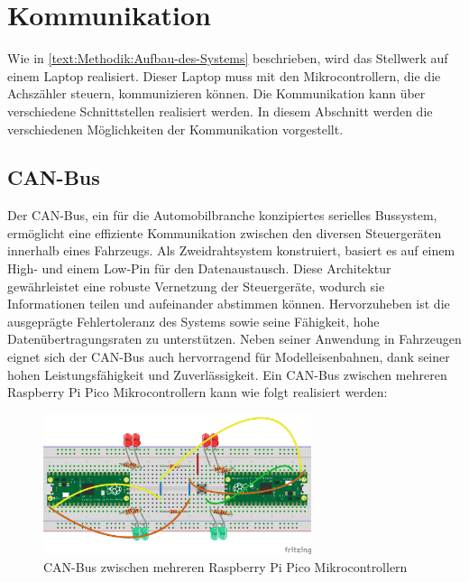 \section{Kommunikation}\label{text:Methodik:Kommunikation}

Wie in \autoref{text:Methodik:Aufbau-des-Systems} beschrieben, wird das Stellwerk auf einem Laptop realisiert. Dieser Laptop muss mit den Mikrocontrollern, die die Achszähler steuern, kommunizieren können. Die Kommunikation kann über verschiedene Schnittstellen realisiert werden. In diesem Abschnitt werden die verschiedenen Möglichkeiten der Kommunikation vorgestellt.

\subsection{CAN-Bus}\label{text:Methodik:Kommunikation:CAN-Bus}

Der CAN-Bus, ein für die Automobilbranche konzipiertes serielles Bussystem, ermöglicht eine effiziente Kommunikation zwischen den diversen Steuergeräten innerhalb eines Fahrzeugs. Als Zweidrahtsystem konstruiert, basiert es auf einem High- und einem Low-Pin für den Datenaustausch. Diese Architektur gewährleistet eine robuste Vernetzung der Steuergeräte, wodurch sie Informationen teilen und aufeinander abstimmen können. Hervorzuheben ist die ausgeprägte Fehlertoleranz des Systems sowie seine Fähigkeit, hohe Datenübertragungsraten zu unterstützen. Neben seiner Anwendung in Fahrzeugen eignet sich der CAN-Bus auch hervorragend für Modelleisenbahnen, dank seiner hohen Leistungsfähigkeit und Zuverlässigkeit. Ein CAN-Bus zwischen mehreren Raspberry Pi Pico Mikrocontrollern kann wie folgt realisiert werden:

\begin{figure}[H]
    \centering
    \includegraphics[width=0.7\textwidth]{Assets/Images/3-Methodik/CANBus-Test.png}
    \caption{CAN-Bus zwischen mehreren Raspberry Pi Pico Mikrocontrollern}\label{abb:Methodik:Kommunikation:CAN-Bus}
\end{figure}

